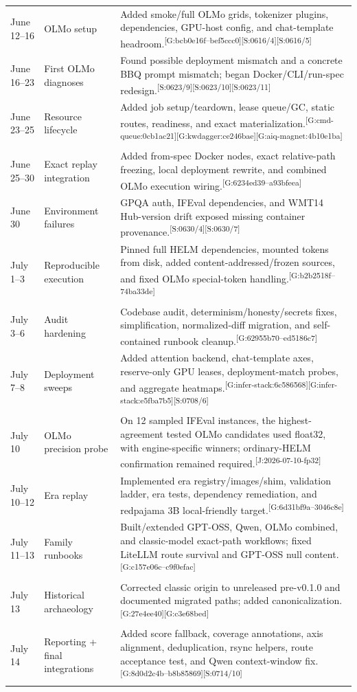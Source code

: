 \documentclass[11pt,oneside]{report}
\newcommand{\code}[1]{\texttt{\detokenize{#1}}}
\newcommand{\evmark}[1]{\allowbreak\textsuperscript{\scriptsize\textnormal{[#1]}}}
\newcommand{\slideref}[2]{\evmark{S:#1/#2}}
\newcommand{\gitref}[1]{\evmark{G:#1}}
\newcommand{\journalref}[1]{\evmark{J:#1}}
\begin{document}
\begin{longtable}{@{}P{0.12\textwidth}P{0.27\textwidth}P{0.51\textwidth}@{}}
June 12--16 & OLMo setup & Added smoke/full OLMo grids, tokenizer plugins, dependencies, GPU-host config, and chat-template headroom.\gitref{bcb0e16f--bef5ccc0}\slideref{0616}{4}\slideref{0616}{5} \\
June 16--23 & First OLMo diagnoses & Found possible deployment mismatch and a concrete BBQ prompt mismatch; began Docker/CLI/run-spec redesign.\slideref{0623}{9}\slideref{0623}{10}\slideref{0623}{11} \\
June 23--25 & Resource lifecycle & Added job setup/teardown, lease queue/GC, static routes, readiness, and exact \code{run_spec.json} materialization.\gitref{cmd-queue:0cb1ac21}\gitref{kwdagger:ce246bae}\gitref{aiq-magnet:4b10e1ba} \\
June 25--30 & Exact replay integration & Added from-spec Docker nodes, exact relative-path freezing, local deployment rewrite, and combined OLMo execution wiring.\gitref{6234ed39--a93bfeea} \\
June 30 & Environment failures & GPQA auth, IFEval dependencies, and WMT14 Hub-version drift exposed missing container provenance.\slideref{0630}{4}\slideref{0630}{7} \\
July 1--3 & Reproducible execution & Pinned full HELM dependencies, mounted tokens from disk, added content-addressed/frozen sources, and fixed OLMo special-token handling.\gitref{b2b2518f--74ba33de} \\
July 3--6 & Audit hardening & Codebase audit, determinism/honesty/secrets fixes, simplification, normalized-diff migration, and self-contained runbook cleanup.\gitref{62955b70--ed5186c7} \\
July 7--8 & Deployment sweeps & Added attention backend, chat-template axes, reserve-only GPU leases, deployment-match probes, and aggregate heatmaps.\gitref{infer-stack:6c586568}\gitref{infer-stack:e5fba7b5}\slideref{0708}{6} \\
July 10 & OLMo precision probe & On 12 sampled IFEval instances, the highest-agreement tested OLMo candidates used float32, with engine-specific winners; ordinary-HELM confirmation remained required.\journalref{2026-07-10-fp32} \\
July 10--12 & Era replay & Implemented era registry/images/shim, validation ladder, era tests, dependency remediation, and redpajama 3B local-friendly target.\gitref{6d31bf9a--3046c8e} \\
July 11--13 & Family runbooks & Built/extended GPT-OSS, Qwen, OLMo combined, and classic-model exact-path workflows; fixed LiteLLM route survival and GPT-OSS null content.\gitref{c157e06c--c9f0efac} \\
July 13 & Historical archaeology & Corrected classic origin to unreleased pre-v0.1.0 and documented migrated \code{class_name} paths; added canonicalization.\gitref{27e4ee40}\gitref{c3e68bed} \\
July 14 & Reporting + final integrations & Added score fallback, coverage annotations, axis alignment, deduplication, rsync helpers, route acceptance test, and Qwen context-window fix.\gitref{8d0d2c4b--b8b85869}\slideref{0714}{10} \\
\bottomrule
\end{longtable}
\end{document}
